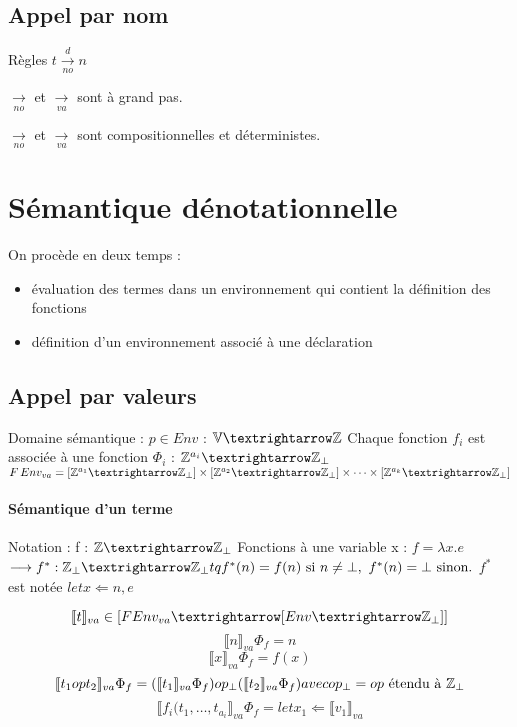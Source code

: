 \documentclass[10pt,a4paper]{article}
\newcommand{\semm}[1]{\llbracket #1 \rrbracket }
\newcommand{\Vs}{\mathbb{V}}
\begin{document}
\subsection{Appel par nom}

Règles $t \xrightarrow[no]{d} n$

\begin{rem}
 $\xrightarrow[no]{}$ et $\xrightarrow[va]{}$ sont à grand pas.
\end{rem}

\begin{prop}
 $\xrightarrow[no]{}$ et $\xrightarrow[va]{}$  sont compositionnelles et déterministes.
\end{prop}


\section{Sémantique dénotationnelle}

On procède en deux temps :
\begin{itemize}
 \item évaluation des termes dans un environnement qui contient la définition des fonctions
 \item définition d'un environnement associé à une déclaration
\end{itemize}

\subsection{Appel par valeurs}

Domaine sémantique : $p \in Env$ : $\Vs → \Zs$
Chaque fonction $f_i$ est associée à une fonction $\Phi_i$ : $\Zs^{a_i} → \Zs_{\bot}$
$F\,Env_{va} = [ \Zs^{a_1} → \Zs_{\bot}] \times [ \Zs^{a_2} → \Zs_{\bot}] \times \dots \times [ \Zs^{a_k} → \Zs_{\bot}]$

\paragraph{Sémantique d'un terme}

Notation : f : $\Zs → \Zs_{\bot}$
Fonctions à une variable x : $f = \lambda x . e$
$\longrightarrow f^* : \Zs_{\bot} → \Zs_{\bot} tq f^*(n) = f(n) \text{ si } n \not = \bot,\ f^*(n) = \bot \text{ sinon}.$
$f^*$ est notée $let x \Leftarrow n,e$

$$\semm{t}_{va} \in [FEnv_{va} → [Env → \Zs_{\bot} ]]$$
$$\semm{n}_{va} \Phi_f = n$$
$$\semm{x}_{va} \Phi_f = f(x)$$
$$\semm{t_1 op t_2}_{va} \Phi_f = (\semm{t_1}_{va} \Phi_f) op_{\bot} (\semm{t_2}_{va} \Phi_f) avec op_{\bot} = op \text{ étendu à } \Zs_{\bot}$$
$$\semm{f_i(t_1, \dots, t_{a_i}}_{va} \Phi_f = let x_1 \Leftarrow \semm{v_1}_{va} $$
\end{document}
